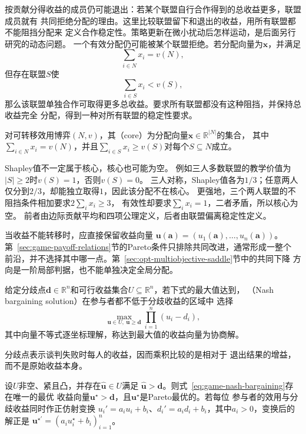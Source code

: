 按贡献分得收益的成员仍可能退出：若某个联盟自行合作得到的总收益更多，联盟成员就有
共同拒绝分配的理由。这里比较联盟留下和退出的收益，用所有联盟都不能阻挡分配来
定义合作稳定性。策略更新在微小扰动后怎样运动，是后面另行研究的动态问题。
一个有效分配仍可能被某个联盟拒绝。若分配向量为\(\bm{x}\)，并满足
\[
  \sum_{i\in N}x_i=v(N),
\]
但存在联盟\(S\)使
\[
  \sum_{i\in S}x_i<v(S),
\]
那么该联盟单独合作可取得更多总收益。要求所有联盟都没有这种阻挡，并保持总收益完全
分配，得到一种对所有联盟的稳定性要求。
\begin{definition}[合作博弈的核心]
\label{def:game-cooperative-core}
对可转移效用博弈$(N,v)$，其（core）为分配向量$\bm x\in\mathbb R^{|N|}$的集合，
其中$\sum_{i\in N}x_i=v(N)$，并且$\sum_{i\in S}x_i\geq v(S)$对每个$S\subseteq N$成立。
\end{definition}
Shapley值不一定属于核心，核心也可能为空。
例如三人多数联盟的教学价值为$|S|\geq2$时$v(S)=1$，否则$v(S)=0$。
三人对称，Shapley值各为$1/3$；任意两人仅分到$2/3$，却能独立取得$1$，因此该分配不在核心。
更强地，三个两人联盟的不阻挡条件相加要求$2\sum_i x_i\geq3$，
有效性却要求$\sum_i x_i=1$，二者矛盾，所以核心为空。
前者由边际贡献平均和四项公理定义，后者由联盟偏离稳定性定义。

当收益不能转移时，应直接保留收益向量
\(\bm{u}(\bm{a})=(u_1(\bm{a}),\ldots,u_n(\bm{a}))\)。
第~\ref{sec:game-payoff-relations}节的Pareto条件只排除共同改进，通常形成一整个
前沿，并不选择其中哪一点。第~\ref{sec:opt-multiobjective-saddle}节中的共同下降
方向是一阶局部判据，也不能单独决定全局分配。

\begin{definition}[Nash乘积协商解]
\label{def:game-nash-bargaining-solution}
给定分歧点\(\bm{d}\in\mathbb R^n\)和可行收益集合\(U\subseteq\mathbb{R}^n\)，若下式的最大值达到，
（Nash bargaining solution）在参与者都不低于分歧收益的区域中
选择
\begin{equation}
  \max_{\bm{u}\in U,\ \bm{u}\geq\bm{d}}
  \prod_{i=1}^{n}(u_i-d_i),
  \label{eq:game-nash-bargaining}
\end{equation}
其中向量不等式逐坐标理解，称达到最大值的收益向量为协商解。
\end{definition}
分歧点表示谈判失败时每人的收益，因而乘积比较的是相对于
退出结果的增益，而不是原始收益本身。

\begin{theorem}
\label{thm:game-nash-bargaining-properties}
设\(U\)非空、紧且凸，并存在\(\widehat{\bm{u}}\in U\)满足
\(\widehat{\bm{u}}>\bm{d}\)。则式~\eqref{eq:game-nash-bargaining}存在唯一的最优
收益向量\(\bm{u}^\star>\bm{d}\)，且\(\bm{u}^\star\)是Pareto最优的。若每位
参与者的效用与分歧收益同时作正仿射变换
\(u_i'=a_i u_i+b_i\)、\(d_i'=a_i d_i+b_i\)，其中\(a_i>0\)，变换后的解正是
\(\bm{u}^{\star\prime}=(a_i u_i^\star+b_i)_{i=1}^n\)。
\end{theorem}

